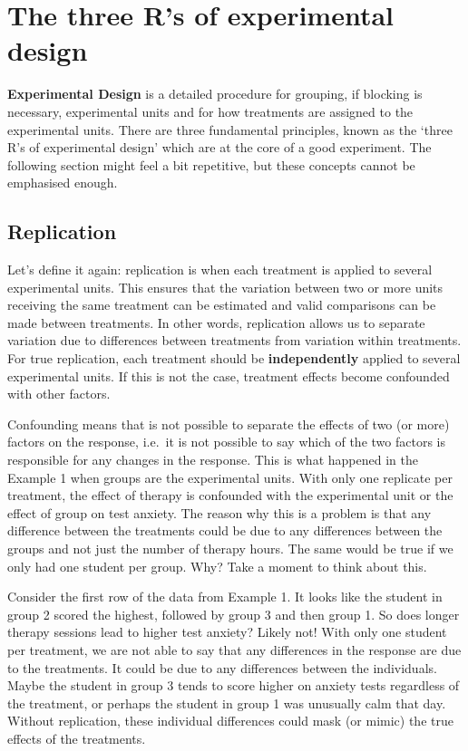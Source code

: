 \documentclass[
  letterpaper,
  DIV=11,
  numbers=noendperiod,
  oneside]{scrreprt}
\begin{document}
\chapter{The three R's of experimental
design}\label{the-three-rs-of-experimental-design}

\textbf{Experimental Design} is a detailed procedure for grouping, if
blocking is necessary, experimental units and for how treatments are
assigned to the experimental units. There are three fundamental
principles, known as the `three R's of experimental design' which are at
the core of a good experiment. The following section might feel a bit
repetitive, but these concepts cannot be emphasised enough.

\section{Replication}\label{replication}

Let's define it again: replication is when each treatment is applied to
several experimental units. This ensures that the variation between two
or more units receiving the same treatment can be estimated and valid
comparisons can be made between treatments. In other words, replication
allows us to separate variation due to differences between treatments
from variation within treatments. For true replication, each treatment
should be \textbf{independently} applied to several experimental units.
If this is not the case, treatment effects become confounded with other
factors.

Confounding means that is not possible to separate the effects of two
(or more) factors on the response, i.e.~it is not possible to say which
of the two factors is responsible for any changes in the response. This
is what happened in the Example 1 when groups are the experimental
units. With only one replicate per treatment, the effect of therapy is
confounded with the experimental unit or the effect of group on test
anxiety. The reason why this is a problem is that any difference between
the treatments could be due to any differences between the groups and
not just the number of therapy hours. The same would be true if we only
had one student per group. Why? Take a moment to think about this.

Consider the first row of the data from Example 1. It looks like the
student in group 2 scored the highest, followed by group 3 and then
group 1. So does longer therapy sessions lead to higher test anxiety?
Likely not! With only one student per treatment, we are not able to say
that any differences in the response are due to the treatments. It could
be due to any differences between the individuals. Maybe the student in
group 3 tends to score higher on anxiety tests regardless of the
treatment, or perhaps the student in group 1 was unusually calm that
day. Without replication, these individual differences could mask (or
mimic) the true effects of the treatments.
\end{document}
